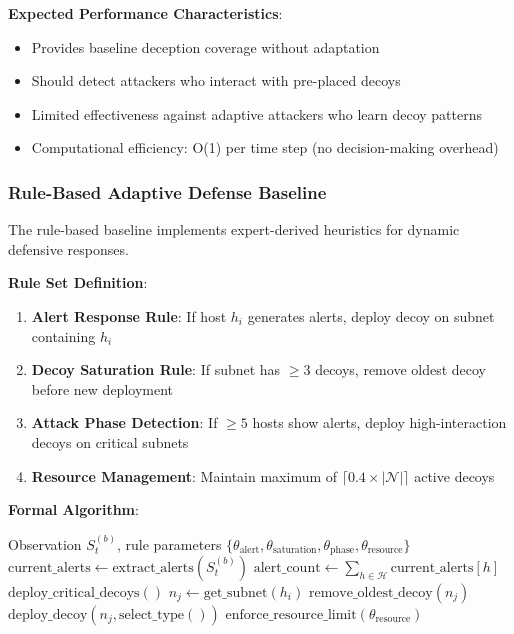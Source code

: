 \documentclass[12pt,oneside]{article}
\begin{document}
\textbf{Expected Performance Characteristics}:
\begin{itemize}
    \item Provides baseline deception coverage without adaptation
    \item Should detect attackers who interact with pre-placed decoys
    \item Limited effectiveness against adaptive attackers who learn decoy patterns
    \item Computational efficiency: O(1) per time step (no decision-making overhead)
\end{itemize}

\subsubsection{Rule-Based Adaptive Defense Baseline}

The rule-based baseline implements expert-derived heuristics for dynamic defensive responses.

\textbf{Rule Set Definition}:
\begin{enumerate}
    \item \textbf{Alert Response Rule}: If host $h_i$ generates alerts, deploy decoy on subnet containing $h_i$
    \item \textbf{Decoy Saturation Rule}: If subnet has $\geq 3$ decoys, remove oldest decoy before new deployment
    \item \textbf{Attack Phase Detection}: If $\geq 5$ hosts show alerts, deploy high-interaction decoys on critical subnets
    \item \textbf{Resource Management}: Maintain maximum of $\lceil 0.4 \times |\mathcal{N}| \rceil$ active decoys
\end{enumerate}

\textbf{Formal Algorithm}:
\begin{algorithm}[H]
\caption{Rule-Based Adaptive Defense}
\label{alg:rule_baseline}
\begin{algorithmic}[1]
\REQUIRE Observation $S_t^{(b)}$, rule parameters $\{\theta_{\text{alert}}, \theta_{\text{saturation}}, \theta_{\text{phase}}, \theta_{\text{resource}}\}$
\STATE $\text{current\_alerts} \leftarrow \text{extract\_alerts}(S_t^{(b)})$
\STATE $\text{alert\_count} \leftarrow \sum_{h \in \mathcal{H}} \text{current\_alerts}[h]$
    \STATE $\text{deploy\_critical\_decoys}()$ 
\ELSE
        \STATE $n_j \leftarrow \text{get\_subnet}(h_i)$
            \STATE $\text{remove\_oldest\_decoy}(n_j)$ 
        \ENDIF
        \STATE $\text{deploy\_decoy}(n_j, \text{select\_type}())$ 
    \ENDFOR
\ENDIF
\STATE $\text{enforce\_resource\_limit}(\theta_{\text{resource}})$ 
\end{algorithmic}
\end{algorithm}
\end{document}
